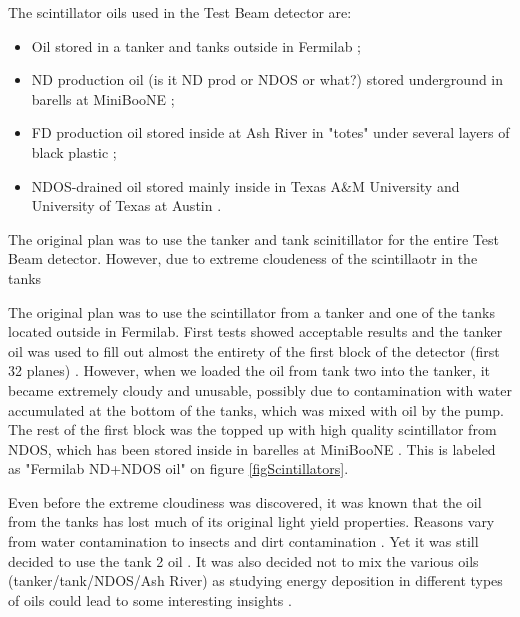 \documentclass[12pt,a4paper]{article}
\begin{document}
The scintillator oils used in the Test Beam detector are:
\begin{itemize}
\item Oil stored in a tanker and tanks outside in Fermilab \cite{NOVA-doc-38349};
\item ND production oil (is it ND prod or NDOS or what?) stored underground in barells at MiniBooNE \cite{NOVA-doc-33012};
\item FD production oil stored inside at Ash River in "totes" under several layers of black plastic \cite{NOVA-doc-34067};
\item NDOS-drained oil stored mainly inside in Texas A\&M University and University of Texas at Austin \cite{NOVA-doc-38740, NOVA-doc-39088}.
\end{itemize}

The original plan \cite{NOVA-doc-34196} was to use the tanker and tank scinitillator for the entire Test Beam detector. However, due to extreme cloudeness of the scintillaotr in the tanks 

The original plan \cite{NOVA-doc-34196} was to use the scintillator from a tanker and one of the tanks located outside in Fermilab. First tests showed acceptable results and the tanker oil was used to fill out almost the entirety of the first block of the detector (first 32 planes) \cite{NOVA-doc-38349}. However, when we loaded the oil from tank two into the tanker, it became extremely cloudy and unusable, possibly due to contamination with water accumulated at the bottom of the tanks, which was mixed with oil by the pump. The rest of the first block was the topped up with high quality scintillator from NDOS, which has been stored inside in barelles at MiniBooNE \cite{NOVA-doc-33012}. This is labeled as "Fermilab ND+NDOS oil" on figure \ref{figScintillators}.



Even before the extreme cloudiness was discovered, it was known that the oil from the tanks has lost much of its original light yield properties. Reasons vary from water contamination to insects and dirt contamination \cite{NOVA-doc-34046-v2}. Yet it was still decided to use the tank 2 oil \cite{NOVA-doc-34196}. It was also decided not to mix the various oils (tanker/tank/NDOS/Ash River) as studying energy deposition in different types of oils could lead to some interesting insights \cite{NOVA-doc-34046-v2}.
\end{document}
